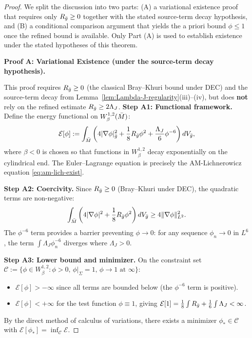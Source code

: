\begin{proof}
We split the discussion into two parts: (A) a variational existence proof that requires only $R_{\bar{g}} \geq 0$ together with the stated source-term decay hypothesis, and (B) a conditional comparison argument that yields the a priori bound $\phi \leq 1$ once the refined bound is available. Only Part (A) is used to establish existence under the stated hypotheses of this theorem.

\textbf{Proof A: Variational Existence (under the source-term decay hypothesis).}

This proof requires $R_{\bar{g}} \geq 0$ (the classical Bray--Khuri bound under DEC) and the source-term decay from Lemma~\ref{lem:Lambda-J-regularity}(iii)--(iv), but does \textbf{not} rely on the refined estimate $R_{\bar{g}} \geq 2\Lambda_J$.
\textbf{Step A1: Functional framework.} Define the energy functional on $W^{1,2}_\beta(\bar{M})$:
\[
\mathcal{E}[\phi] := \int_{\bar{M}} \left(4|\nabla\phi|^2_{\bar{g}} + \frac{1}{8}R_{\bar{g}}\phi^2 + \frac{\Lambda_J}{6}\phi^{-6}\right) dV_{\bar{g}},
\]
where $\beta < 0$ is chosen so that functions in $W^{1,2}_\beta$ decay exponentially on the cylindrical end. The Euler--Lagrange equation is precisely the AM-Lichnerowicz equation \eqref{eq:am-lich-exist}.

\textbf{Step A2: Coercivity.} Since $R_{\bar{g}} \geq 0$ (Bray--Khuri under DEC), the quadratic terms are non-negative:
\[
\int_{\bar{M}} \left(4|\nabla\phi|^2 + \frac{1}{8}R_{\bar{g}}\phi^2\right) dV_{\bar{g}} \geq 4\|\nabla\phi\|_{L^2}^2.
\]
The $\phi^{-6}$ term provides a barrier preventing $\phi \to 0$: for any sequence $\phi_n \to 0$ in $L^6$, the term $\int \Lambda_J \phi_n^{-6}$ diverges where $\Lambda_J > 0$.

\textbf{Step A3: Lower bound and minimizer.} On the constraint set $\mathcal{C} := \{\phi \in W^{1,2}_\beta : \phi > 0, \, \phi|_\Sigma = 1, \, \phi \to 1 \text{ at } \infty\}$:
\begin{itemize}
    \item $\mathcal{E}[\phi] > -\infty$ since all terms are bounded below (the $\phi^{-6}$ term is positive).
    \item $\mathcal{E}[\phi] < +\infty$ for the test function $\phi \equiv 1$, giving $\mathcal{E}[1] = \frac{1}{8}\int R_{\bar{g}} + \frac{1}{6}\int \Lambda_J < \infty$.
\end{itemize}
By the direct method of calculus of variations, there exists a minimizer $\phi_* \in \mathcal{C}$ with $\mathcal{E}[\phi_*] = \inf_{\mathcal{C}}\mathcal{E}$.


\end{proof}
